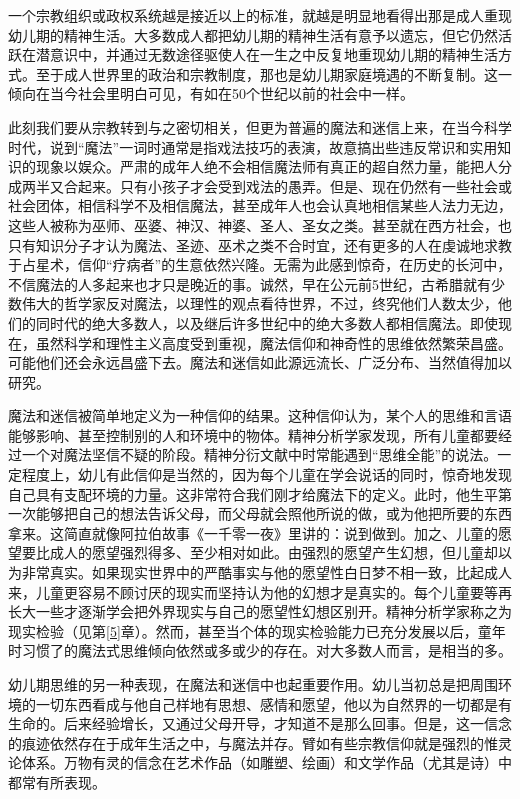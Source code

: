 \documentclass[UTF8,10pt,a4paper,openany]{book}
\begin{document}
一个宗教组织或政权系统越是接近以上的标准，就越是明显地看得出那是成人重现幼儿期的精神生活。大多数成人都把幼儿期的精神生活有意予以遗忘，但它仍然活跃在潜意识中，并通过无数途径驱使人在一生之中反复地重现幼儿期的精神生活方式。至于成人世界里的政治和宗教制度，那也是幼儿期家庭境遇的不断复制。这一倾向在当今社会里明白可见，有如在50个世纪以前的社会中一样。

此刻我们要从宗教转到与之密切相关，但更为普遍的魔法和迷信上来，在当今科学时代，说到“魔法”一词时通常是指戏法技巧的表演，故意搞出些违反常识和实用知识的现象以娱众。严肃的成年人绝不会相信魔法师有真正的超自然力量，能把人分成两半又合起来。只有小孩子才会受到戏法的愚弄。但是、现在仍然有一些社会或社会团体，相信科学不及相信魔法，甚至成年人也会认真地相信某些人法力无边，这些人被称为巫师、巫婆、神汉、神婆、圣人、圣女之类。甚至就在西方社会，也只有知识分子才认为魔法、圣迹、巫术之类不合时宜，还有更多的人在虔诚地求教于占星术，信仰“疗病者”的生意依然兴隆。无需为此感到惊奇，在历史的长河中，不信魔法的人多起来也才只是晚近的事。诚然，早在公元前5世纪，古希腊就有少数伟大的哲学家反对魔法，以理性的观点看待世界，不过，终究他们人数太少，他们的同时代的绝大多数人，以及继后许多世纪中的绝大多数人都相信魔法。即使现在，虽然科学和理性主义高度受到重视，魔法信仰和神奇性的思维依然繁荣昌盛。可能他们还会永远昌盛下去。魔法和迷信如此源远流长、广泛分布、当然值得加以研究。

魔法和迷信被简单地定义为一种信仰的结果。这种信仰认为，某个人的思维和言语能够影响、甚至控制别的人和环境中的物体。精神分析学家发现，所有儿童都要经过一个对魔法坚信不疑的阶段。精神分衍文献中时常能遇到“思维全能”的说法。一定程度上，幼儿有此信仰是当然的，因为每个儿童在学会说话的同时，惊奇地发现自己具有支配环境的力量。这非常符合我们刚才给魔法下的定义。此时，他生平第一次能够把自己的想法告诉父母，而父母就会照他所说的做，或为他把所要的东西拿来。这简直就像阿拉伯故事《一千零一夜》里讲的：说到做到。加之、儿童的愿望要比成人的愿望强烈得多、至少相对如此。由强烈的愿望产生幻想，但儿童却以为非常真实。如果现实世界中的严酷事实与他的愿望性白日梦不相一致，比起成人来，儿童更容易不顾讨厌的现实而坚持认为他的幻想才是真实的。每个儿童要等再长大一些才逐渐学会把外界现实与自己的愿望性幻想区别开。精神分析学家称之为现实检验（见第\ref{5}章）。然而，甚至当个体的现实检验能力已充分发展以后，童年时习惯了的魔法式思维倾向依然或多或少的存在。对大多数人而言，是相当的多。

幼儿期思维的另一种表现，在魔法和迷信中也起重要作用。幼儿当初总是把周围环境的一切东西看成与他自己样地有思想、感情和愿望，他以为自然界的一切都是有生命的。后来经验增长，又通过父母开导，才知道不是那么回事。但是，这一信念的痕迹依然存在于成年生活之中，与魔法并存。臂如有些宗教信仰就是强烈的惟灵论体系。万物有灵的信念在艺术作品（如雕塑、绘画）和文学作品（尤其是诗）中都常有所表现。
\end{document}
